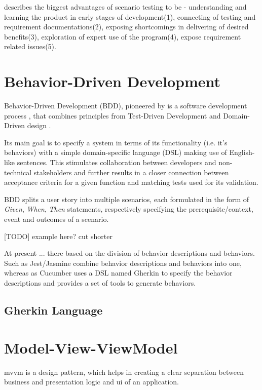 \textcite{kaner2013introduction} describes the biggest advantages of scenario testing to be  - understanding and learning the product in early stages of development(1), connecting of testing and requirement documentations(2), exposing shortcomings in delivering of desired benefits(3), exploration of expert use of the program(4), expose requirement related issues(5).

\section{Behavior-Driven Development}
Behavior-Driven Development (BDD), pioneered by  \textcite{north2006behavior} is a software development
process , that combines principles from Test-Driven Development and Domain-Driven design \parencite{evans2004domain}.

Its main goal is to specify a system in terms of its functionality (i.e. it's behaviors) with a simple domain-specific language (DSL) making use of English-like sentences. This stimulates collaboration between developers and non-technical stakeholders and further results in a closer connection between acceptance criteria for a given function and matching tests used for its validation.

BDD splits a user story into multiple scenarios, each formulated in the form of \textit{Given}, \textit{When}, \textit{Then} statements, respectively specifying the prerequisite/context, event and outcomes of a scenario. 

[TODO] example here? cut shorter

At present ... there based on the division of behavior descriptions and behaviors. Such as Jest/Jasmine combine behavior descriptions and behaviors into one, whereas as Cucumber uses a DSL named Gherkin to specify the behavior descriptions and provides a set of tools to generate behaviors.


\subsection{Gherkin Language}

\section{Model-View-ViewModel}
\label{sec:mvvm}
\gls{mvvm} is a design pattern, which helps in creating a clear separation between business and presentation logic and \gls{ui} of an application. \parencite[7-9]{microsoft_mvvm}

